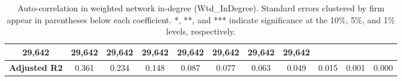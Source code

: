 \begin{table}
{\begin{tabular}{ccccccccccc}
  \multicolumn{1}{c|}{29,642} &
  \multicolumn{1}{c|}{29,642} &
  \multicolumn{1}{c|}{29,642} &
  \multicolumn{1}{c|}{29,642} &
  \multicolumn{1}{c|}{29,642} &
  \multicolumn{1}{c|}{29,642} &
  \multicolumn{1}{c|}{29,642} &
  \multicolumn{1}{c|}{29,642} \\ \hline
\multicolumn{1}{|c|}{\textbf{Adjusted R2}} &
  \multicolumn{1}{c|}{0.361} &
  \multicolumn{1}{c|}{0.234} &
  \multicolumn{1}{c|}{0.148} &
  \multicolumn{1}{c|}{0.087} &
  \multicolumn{1}{c|}{0.077} &
  \multicolumn{1}{c|}{0.063} &
  \multicolumn{1}{c|}{0.049} &
  \multicolumn{1}{c|}{0.015} &
  \multicolumn{1}{c|}{0.001} &
  \multicolumn{1}{c|}{0.000} \\ \hline
\end{tabular}}
\caption{Auto-correlation in weighted network in-degree (Wtd\_InDegree).  Standard errors clustered by firm appear in parentheses below each coefficient. *, **, and *** indicate significance at the 10\%,  5\%, and 1\% levels, respectively. }
\label{tab:TEAutoCorrIn}
\end{table}

